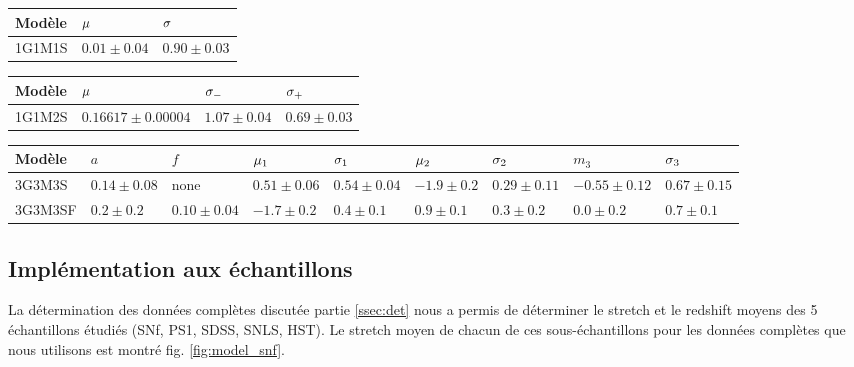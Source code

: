 \documentclass[a4paper, 12pt, svgnames]{article}
\begin{document}
\begin{table}[htbp!]
\begin{tabularx}{\linewidth}{|Y*{6}{|Y}|}
    \end{tabularx} \bigbreak

\begin{tabularx}{\linewidth}{|Y*{2}{|Y}|}\hline

     Modèle & $\mu$ & $\sigma$ \\\hline\hline

    1G1M1S & $0.01 \pm 0.04$ & $0.90 \pm 0.03$ \\\hline

\end{tabularx} \bigbreak

\begin{tabularx}{\linewidth}{|Y*{3}{|Y}|}\hline

     Modèle & $\mu$ & $\sigma_-$ & $\sigma_+$ \\\hline\hline

    1G1M2S & $0.16617 \pm 0.00004$ & $1.07 \pm 0.04$ & $0.69 \pm 0.03$ \\\hline

\end{tabularx} \bigbreak

\begin{tabularx}{\linewidth}{|Y*{8}{|Y}|}\hline

     Modèle & $a$ & $f$ & $\mu_1$ & $\sigma_1$ & $\mu_2$ & $\sigma_2$ &
    $m_3$ & $\sigma_3$ \\\hline\hline

    3G3M3S & $0.14 \pm 0.08$ & none & $0.51 \pm 0.06$ & $0.54 \pm 0.04$ & $-1.9
    \pm 0.2$ & $0.29 \pm 0.11$ & $-0.55 \pm 0.12$ & $0.67 \pm 0.15$ \\\hline
    
    3G3M3SF & $0.2 \pm 0.2 $ & $0.10 \pm 0.04 $ & $-1.7 \pm 0.2$ & $0.4 \pm 0.1$
            & $0.9 \pm 0.1$ & $0.3 \pm 0.2$ & $0.0 \pm 0.2$ & $0.7 \pm 0.1$
            \\\hline

\end{tabularx} \bigbreak

\end{table}

\subsection{Implémentation aux échantillons}\label{ssec:model}

La détermination des données complètes discutée partie \ref{ssec:det} nous a
permis de déterminer le stretch et le redshift moyens des 5 échantillons étudiés
(SNf, PS1, SDSS, SNLS, HST). Le stretch moyen de chacun de ces sous-échantillons
pour les données complètes que nous utilisons est montré fig.
\ref{fig:model_snf}. \bigbreak
\end{document}
